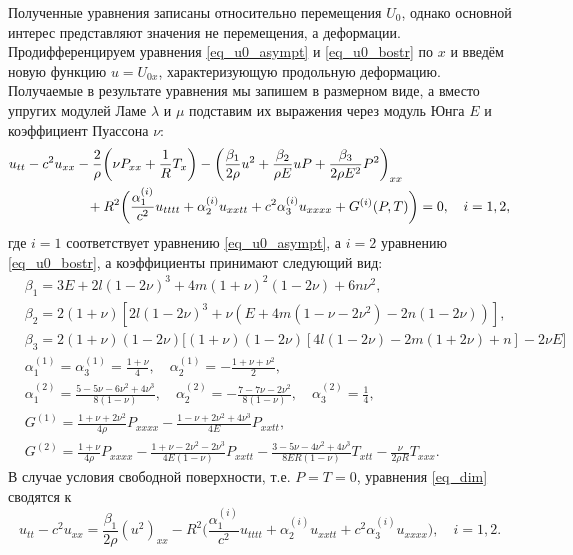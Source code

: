 \documentclass[12pt, a4paper]{article}
\begin{document}
Полученные уравнения записаны относительно перемещения $U_0$, однако основной интерес представляют значения не перемещения, а деформации. Продифференцируем уравнения \eqref{eq_u0_asympt} и \eqref{eq_u0_bostr} по $x$ и введём новую функцию $u = U_{0x}$, характеризующую продольную деформацию. Получаемые в результате уравнения мы запишем в размерном виде, а вместо упругих модулей Ламе $\lambda$ и $\mu$ подставим их выражения через модуль Юнга $E$ и коэффициент Пуассона $\nu$:
\begin{equation}\label{eq_dim}
\begin{split}
&u_{tt} - c^2 u_{xx} - \frac{2}{\rho}\bigg(\nu P_{xx} + \frac1R T_x\bigg) - \left(\frac{\beta_1}{2\rho} u^2 + \frac{\beta_2}{\rho E} u P + \frac{\beta_3}{2\rho E^2} P^2\right)_{xx}\\
&\hspace{20mm} + R^2 \bigg(\frac{\alpha_1^{(i)}}{c^2} u_{tttt} + \alpha_2^{(i)} u_{xxtt} + c^2\alpha_3^{(i)} u_{xxxx} + G^{(i)}(P, T) \bigg) = 0, \quad i = 1,2,
\end{split}
\end{equation}
где $i=1$ соответствует уравнению \eqref{eq_u0_asympt}, а $i=2$ уравнению \eqref{eq_u0_bostr}, а коэффициенты принимают следующий вид:
\begin{align}
\label{beta_1}
&\beta_1 = 3E + 2l(1 - 2\nu)^3 + 4m(1 + \nu)^2 (1 - 2\nu) + 6n\nu^2,\\
\label{beta_2}
&\beta_2 = 2 (1 + \nu) \left[2 l (1 - 2 \nu)^3 + \nu \left(E + 4m \left(1 - \nu - 2\nu^2\right) - 2n (1 - 2\nu)\right) \right],\\
\label{beta_3}
&\beta_3 = 2(1 + \nu)(1 - 2 \nu) \Big[ (1 + \nu)(1 - 2\nu) [4l \left(1 - 2\nu\right) - 2m(1 + 2\nu) + n] - 2\nu E \Big]\\
\label{alpha_1}
&\alpha_1^{(1)} = \alpha_3^{(1)} = \frac{1 + \nu}{4}, \quad \alpha_2^{(1)} = -\frac{1 + \nu + \nu^2}{2}, \\
\label{alpha_2}
&\alpha_1^{(2)} = \frac{5 - 5\nu - 6\nu^2 + 4\nu^3}{8(1-\nu)},\quad \alpha_2^{(2)} = -\frac{7 - 7\nu - 2\nu^2}{8(1-\nu)}, \quad \alpha_3^{(2)} = \frac14,\\
\label{G1}
&G^{(1)} = \frac{1 + \nu + 2\nu^2}{4\rho} P_{xxxx} - \frac{1 - \nu + 2\nu^2 + 4\nu^3}{4E} P_{xxtt},\\
\label{G2}
&G^{(2)} = \frac{1 + \nu}{4\rho} P_{xxxx} - \frac{1 + \nu - 2\nu^2 - 2\nu^3}{4E(1 - \nu)} P_{xxtt} - \frac{3 - 5\nu - 4\nu^2 + 4\nu^3}{8ER(1 - \nu)} T_{xtt} - \frac{\nu}{2\rho R} T_{xxx}.
\end{align}
В случае условия свободной поверхности, т.е. $P = T = 0$, уравнения \eqref{eq_dim} сводятся к
\begin{equation}\label{eq_dim_free_surf}
u_{tt} - c^2 u_{xx} = \frac{\beta_1}{2\rho}\left(u^2\right)_{xx} -  R^2 \bigg(\frac{\alpha_1^{(i)}}{c^2} u_{tttt} + \alpha_2^{(i)} u_{xxtt} + c^2\alpha_3^{(i)} u_{xxxx}\bigg), \quad i = 1,2.
\end{equation}
\end{document}
